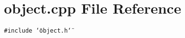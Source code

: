 \section{object.cpp File Reference}
\label{object_8cpp}
{\tt \#include \char`\"{}object.h\char`\"{}}\par

